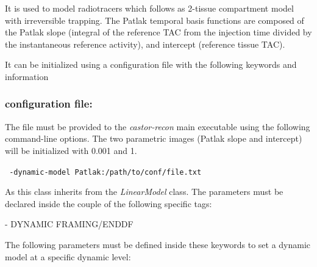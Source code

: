 \documentclass[a4paper, 11pt]{article}
\begin{document}
It is used to model radiotracers which follows as 2-tissue compartment model with irreversible trapping. The Patlak temporal basis functions are composed of the Patlak slope (integral of the reference TAC from the injection time divided by the instantaneous reference activity), and intercept (reference tissue TAC).



It can be initialized using a configuration file with the following keywords and information

\subsubsection{configuration file:}
\label{sss_patlak_cfile}

The file must be provided to the \textit{castor-recon} main executable using the following command-line options. The two parametric images (Patlak slope and intercept) will be initialized with 0.001 and 1.

\bigskip
\verb| -dynamic-model Patlak:/path/to/conf/file.txt|
\bigskip

As this class inherits from the \textit{LinearModel} class. The parameters must be declared inside the couple of the following specific tags:

  - DYNAMIC FRAMING/ENDDF


The following parameters must be defined inside these keywords to set a dynamic model at a specific dynamic level:
\end{document}
